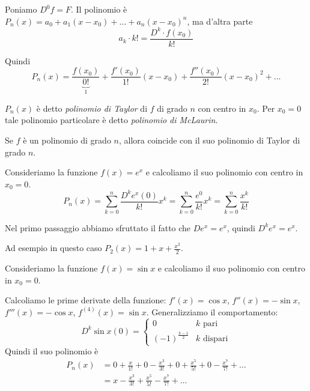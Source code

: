 Poniamo $D^0 f = F$. Il polinomio è $P_n(x) = a_0 + a_1(x-x_0) + \ldots + a_n(x-x_0)^n$, ma d'altra parte
\begin{equation*}
a_k \cdot k! = \frac{D^k \cdot f(x_0)}{k!}
\end{equation*}

Quindi
\begin{equation*}
P_n(x) = \frac{f(x_0)}{\underbrace{0!}_{1}} + \frac{f'(x_0)}{1!}(x-x_0) + \frac{f''(x_0)}{2!} (x-x_0)^2 + \ldots
\end{equation*}

$P_n(x)$ è detto \emph{polinomio di Taylor} di $f$ di grado $n$ con centro in $x_0$. Per $x_0 = 0$ tale polinomio particolare è detto \emph{polinomio di McLaurin}.

\begin{remark}
Se $f$ è un polinomio di grado $n$, allora coincide con il suo polinomio di Taylor di grado $n$.
\end{remark}

\begin{example}
Consideriamo la funzione $f(x) = e^x$ e calcoliamo il suo polinomio con centro in $x_0 = 0$.
\begin{equation*}
P_n (x) = \sum_{k=0}^n \frac{D^k e^x (0)}{k!} x^k = \sum_{k=0}^n \frac{e^0}{k!} x^k = \sum_{k=0}^n \frac{x^k}{k!}
\end{equation*}

Nel primo passaggio abbiamo sfruttato il fatto che $D e^x = e^x$, quindi $D^k e^x = e^x$.

Ad esempio in questo caso $P_2(x) = 1 + x + \frac{x^2}{2}$.
\end{example}

\begin{example}
Consideriamo la funzione $f(x) = \sin x$ e calcoliamo il suo polinomio con centro in $x_0 = 0$.

Calcoliamo le prime derivate della funzione: $f'(x) = \cos x$, $f''(x) = -\sin x$, $f'''(x) = - \cos x$, $f^{(4)}(x) = \sin x$. Generalizziamo il comportamento:
\begin{equation*}
D^k \sin x (0) = \begin{cases}
0 & k \mbox{ pari} \\
(-1)^{\frac{k-1}{2}} & k \mbox{ dispari}
\end{cases}
\end{equation*}
Quindi il suo polinomio è
\begin{align*}
P_n(x) &= 0 + \frac{x}{1!} + 0 - \frac{x^3}{3!} + 0 + \frac{x^5}{5!} + 0 - \frac{x^7}{7!} + \ldots \\
&= x - \frac{x^3}{3!} + \frac{x^5}{5!} - \frac{x^7}{7!} + \ldots
\end{align*}
\end{example}

